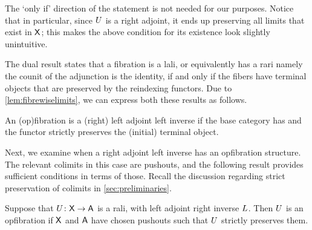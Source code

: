 \documentclass{amsart}
\begin{document}
The `only if' direction of the statement is not needed for our purposes. Notice that in particular, since $U$ is a right adjoint, it ends up preserving all limits that exist in $\mathsf{X}$; this makes the above condition for its existence look slightly unintuitive. 

The dual result states that a fibration is a lali, or equivalently has a rari namely the counit of the adjunction is the identity, if and only if the fibers have terminal objects that are preserved by the reindexing functors. Due to \cref{lem:fibrewiselimits}, we can express both these results as follows.

\begin{cor}
An (op)fibration is a (right) left adjoint left inverse if the base category has and the functor strictly preserves the (initial) terminal object.
\end{cor}

Next, we examine when a right adjoint left inverse has an opfibration structure. The relevant colimits in this case are pushouts, and the following result provides sufficient conditions in terms of those. Recall the discussion regarding strict preservation of colimits in \cref{sec:preliminaries}.

\begin{prop}\label{prop:laritoopfib}
Suppose that $U\colon\mathsf{X}\to\mathsf{A}$ is a rali, with left adjoint right inverse $L$. Then $U$ is an opfibration if $\mathsf{X}$ and $\mathsf{A}$ have chosen pushouts such that $U$ strictly preserves them.
\end{prop}
\end{document}
